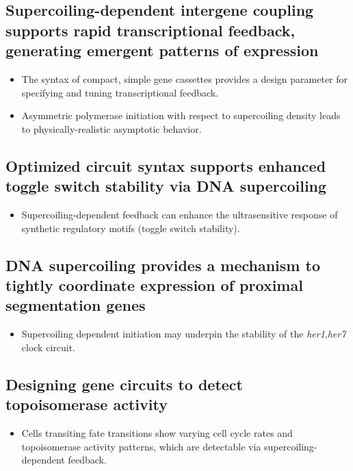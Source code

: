\documentclass[11pt]{article}
\begin{document}
\subsection{Supercoiling-dependent intergene coupling supports rapid  transcriptional feedback, generating emergent patterns of expression}
\begin{itemize}
    \item The syntax of compact, simple gene cassettes provides a design parameter for specifying and tuning transcriptional feedback.

    \item Asymmetric polymerase initiation with respect to supercoiling density leads to physically-realistic asymptotic behavior.
\end{itemize}

\clearpage
\subsection{ Optimized circuit syntax supports enhanced toggle switch stability via DNA supercoiling }
\begin{itemize}
\item Supercoiling-dependent feedback can enhance the ultrasensitive response of synthetic regulatory motifs (toggle switch stability).
\end{itemize}

\clearpage
\subsection{DNA supercoiling provides a mechanism to tightly coordinate expression of proximal segmentation genes }
\begin{itemize}
    \item Supercoiling dependent initiation may underpin the stability of the \textit{her1},\textit{her7} clock circuit.

\end{itemize}

\subsection{Designing gene circuits to detect topoisomerase activity}
\begin{itemize}

    \item Cells transiting fate transitions show varying cell cycle rates and topoisomerase activity patterns, which are detectable via supercoiling-dependent feedback.
\end{itemize}
\end{document}
